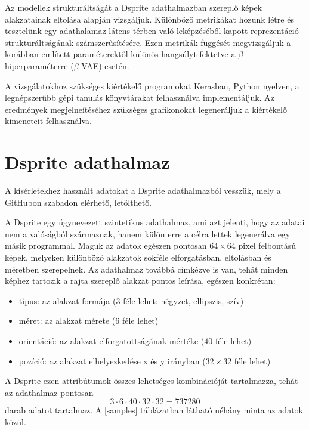 Az modellek strukturáltságát a Dsprite adathalmazban szereplő képek alakzatainak eltolása alapján vizsgáljuk. Különböző metrikákat hozunk létre és tesztelünk egy adathalamaz látens térben való leképzéséből kapott reprezentáció strukturáltságának számszerűsítésére. Ezen metrikák függését megvizsgáljuk a korábban említett paraméterektől különös hangsúlyt fektetve a $\beta$ hiperparaméterre ($\beta$-VAE) esetén.

A vizsgálatokhoz szükséges kiértékelő programokat Kerasban, Python nyelven, a legnépszerűbb gépi tanulás könyvtárakat felhasználva implementáljuk. Az eredmények megjelneítéséhez szükséges grafikonokat legeneráljuk a kiértékelő kimeneteit felhasználva.

\section{Dsprite adathalmaz}

A kísérletekhez használt adatokat a Dsprite \cite{Dsprite} adathalmazból vesszük, mely a GitHubon szabadon elérhető, letölthető.

A Dsprite egy úgynevezett szintetikus adathalmaz, ami azt jelenti, hogy az adatai nem a valóságból származnak, hanem külön erre a célra lettek legenerálva egy másik programmal. Maguk az adatok egészen pontosan $64\times64$ pixel felbontású képek, melyeken különböző alakzatok sokféle elforgatásban, eltolásban és méretben szerepelnek. Az adathalmaz továbbá címkézve is van, tehát minden képhez tartozik a rajta szereplő alakzat pontos leírása, egészen konkrétan:

\begin{itemize}
  \item típus: az alakzat formája ($3$ féle lehet: négyzet, ellipszis, szív)
  \item méret: az alakzat mérete ($6$ féle lehet)
  \item orientáció: az alakzat elforgatottságának mértéke ($40$ féle lehet)
  \item pozíció: az alakzat elhelyezkedése x és y irányban ($32\times32$ féle lehet)
\end{itemize}

A Dsprite ezen attribútumok összes lehetséges kombinációját tartalmazza, tehát az adathalmaz pontosan
$$ 3\cdot6\cdot40\cdot32\cdot32= 737280$$
darab adatot tartalmaz. A \ref{samples} táblázatban látható néhány minta az adatok közül.

